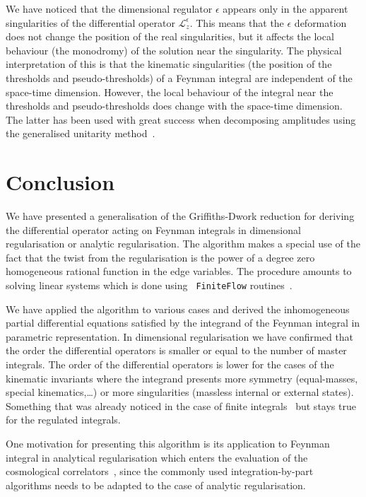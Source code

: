 \documentclass[a4paper,12pt]{article}
\numberwithin{equation}{section}
\numberwithin{figure}{section}
\begin{document}
We have noticed that the dimensional regulator $\epsilon$ appears only in  the
apparent singularities of the differential operator
$\mathscr{L}_z^\epsilon$. This means that the  $\epsilon$ deformation
does not change the position of the real singularities, but it affects
the local behaviour (the monodromy) of the solution near the
singularity.
%
The physical interpretation of this is that the kinematic
singularities (the position of the thresholds
and pseudo-thresholds) of a Feynman integral are independent of the
space-time dimension. However,  the local behaviour of the integral near
the thresholds and pseudo-thresholds does change with the space-time
dimension. The latter has been used with great success
when decomposing amplitudes using the generalised unitarity method~\cite{Bern:2011qt}.

\section{Conclusion}\label{sec:conclusion}
We have presented a generalisation of the Griffiths-Dwork reduction
for deriving the differential operator acting on Feynman integrals in
dimensional regularisation or analytic regularisation. The algorithm
makes a special use of the fact that the twist from the regularisation
is the power of a degree zero homogeneous rational function in the
edge variables. The procedure amounts to
solving linear systems which is done using {\tt
  FiniteFlow} routines~\cite{Peraro:2019svx}.

We have applied the algorithm to various cases and derived the
inhomogeneous partial differential equations satisfied by the integrand of the Feynman integral in parametric representation.
In dimensional regularisation we have confirmed that the order the
differential operators is smaller or equal to the number of master
integrals. The order of the differential operators is lower for the cases of the kinematic invariants where the integrand
presents more symmetry (equal-masses, special kinematics,\dots) or
more singularities (massless internal or external states). Something
that was already noticed in the case of finite integrals~\cite{Lairez:2022zkj}  but stays
true for the regulated integrals.

One motivation for presenting this algorithm is its application to
Feynman integral in analytical regularisation which enters the evaluation of the cosmological
correlators~\cite{Heckelbacher:2022hbq,Chowdhury:2023khl,Chowdhury:2023arc},
since the commonly used  
integration-by-part algorithms needs to be adapted to the case of
analytic regularisation.
\end{document}
